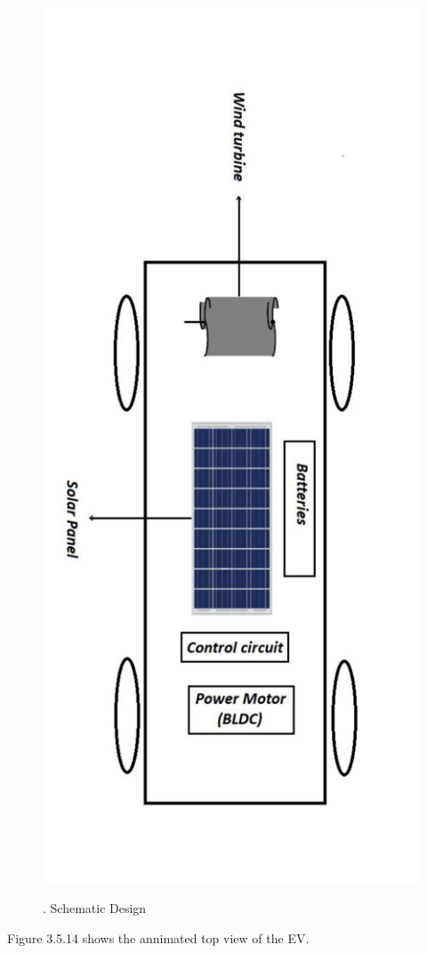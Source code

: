 \documentclass[a4paper,12pt]{article}
\begin{document}
\begin{figure}[!h]
\centering
\includegraphics[scale=0.25]{di.jpg}\\
\caption{. Schematic Design}
\end{figure}
Figure 3.5.14 shows the annimated top view of the EV.\\
\end{document}

